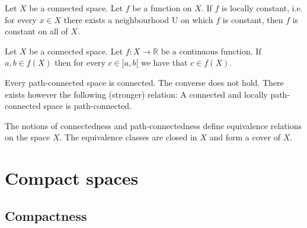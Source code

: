     \begin{property}
        Let $X$ be a connected space. Let $f$ be a function on $X$. If $f$ is locally constant, i.e. for every $x\in X$ there exists a neighbourhood U on which $f$ is constant, then $f$ is constant on all of $X$.
    \end{property}

    \begin{theorem}\label{topology:theorem:intermediate_value_theorem}
        Let $X$ be a connected space. Let $f:X\rightarrow\mathbb{R}$ be a continuous function. If $a, b\in f(X)$ then for every $c\in ]a, b[$ we have that $c\in f(X)$.
    \end{theorem}


    \begin{property}
        Every path-connected space is connected. The converse does not hold. There exists however the following (stronger) relation: A connected and locally path-connected space is path-connected.
    \end{property}

    \begin{remark}
        The notions of connectedness and path-connectedness define equivalence relations on the space $X$. The equivalence classes are closed in $X$ and form a cover of $X$.
    \end{remark}

\section{Compact spaces}
\subsection{Compactness}


